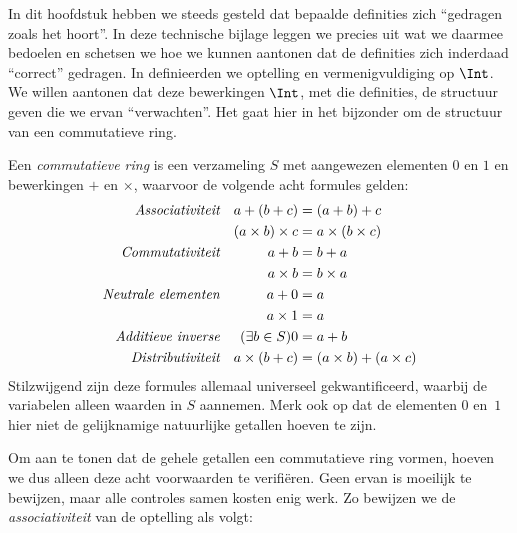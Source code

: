 \documentclass[../../../include/open-logic-section]{subfiles}
\begin{document}
	
In dit hoofdstuk hebben we steeds gesteld dat bepaalde definities zich
``gedragen zoals het hoort''. In deze technische bijlage leggen we
precies uit wat we daarmee bedoelen en schetsen we hoe we kunnen
aantonen dat de definities zich inderdaad ``correct'' gedragen.
In  definieerden we optelling en vermenigvuldiging op
$\Int$. We willen aantonen dat deze bewerkingen $\Int$, met die
definities, de structuur geven die we ervan ``verwachten''. Het gaat
hier in het bijzonder om de structuur van een commutatieve ring.
\begin{defn}
	Een \emph{commutatieve ring} is een verzameling $S$ met aangewezen elementen $0$ en $1$ en bewerkingen $+$ en $\times$, waarvoor de volgende acht formules gelden:
	\begin{align*}
		\emph{Associativiteit}&&a + (b+ c) & = (a + b) + c \\
		&& (a \times b) \times c & = a \times (b\times c)\\
		\emph{Commutativiteit}&&a + b &= b+ a  \\
		&&  a \times b&= b\times a\\ 
		\emph{Neutrale elementen}&&a + 0 &= a \\
		&& a \times 1 &= a\\
		\emph{Additieve inverse}&&(\exists b\in S)0&=a + b\\
		\emph{Distributiviteit}&&a \times (b+ c ) &= (a \times b) + (a \times c)
	\end{align*}
	Stilzwijgend zijn deze formules allemaal universeel gekwantificeerd, waarbij de variabelen alleen waarden in $S$ aannemen. Merk ook op dat de elementen $0$ en~$1$ hier niet de gelijknamige natuurlijke getallen hoeven te zijn.
\end{defn}
Om aan te tonen dat de gehele getallen een commutatieve ring vormen,
hoeven we dus alleen deze acht voorwaarden te verifiëren. Geen ervan
is moeilijk te bewijzen, maar alle controles samen kosten enig werk.
Zo bewijzen we de \emph{associativiteit} van de optelling als volgt:
\end{document}
